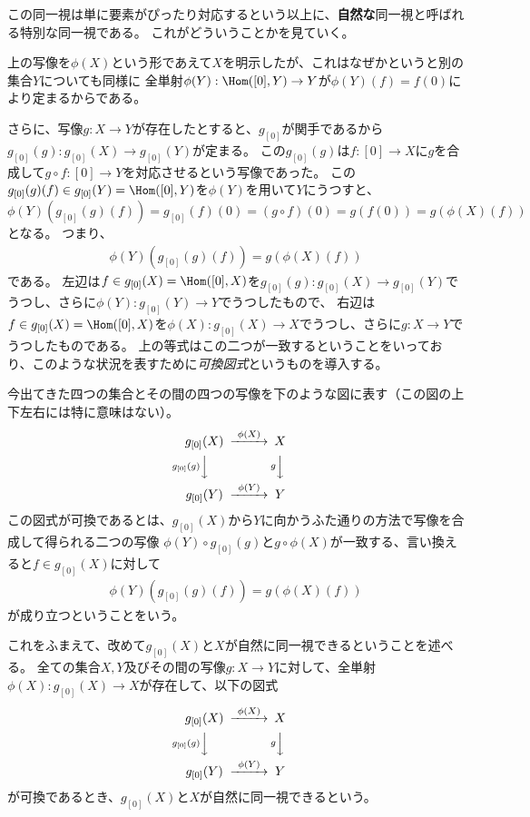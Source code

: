 \documentclass{jsarticle}
\begin{document}
この同一視は単に要素がぴったり対応するという以上に、\textbf{自然な}同一視と呼ばれる特別な同一視である。
これがどういうことかを見ていく。

上の写像を$\phi(X)$という形であえて$X$を明示したが、これはなぜかというと別の集合$Y$についても同様に
全単射$\phi(Y):\Hom([0],Y) \to Y$が$\phi(Y)(f)=f(0)$により定まるからである。

さらに、写像$g:X \to Y$が存在したとすると、$g_{[0]}$が関手であるから$g_{[0]}(g):g_{[0]}(X) \to g_{[0]}(Y)$が定まる。
この$g_{[0]}(g)$は$f:[0] \to X$に$g$を合成して$g\circ f:[0] \to Y$を対応させるという写像であった。
この$g_{[0]}(g)(f)\in g_{[0]}(Y)=\Hom([0],Y)$を$\phi(Y)$を用いて$Y$にうつすと、$\phi(Y)(g_{[0]}(g)(f))=g_{[0]}(f)(0)=(g\circ f)(0)=g(f(0))=g(\phi(X)(f))$となる。
つまり、
\begin{align*}
\phi(Y)(g_{[0]}(g)(f))=g(\phi(X)(f))
\end{align*}
である。
左辺は$f\in g_{[0]}(X)=\Hom([0],X)$を$g_{[0]}(g):g_{[0]}(X) \to g_{[0]}(Y)$でうつし、さらに$\phi(Y):g_{[0]}(Y) \to Y$でうつしたもので、
右辺は$f\in g_{[0]}(X)=\Hom([0],X)$を$\phi(X):g_{[0]}(X) \to X$でうつし、さらに$g:X \to Y$でうつしたものである。
上の等式はこの二つが一致するということをいっており、このような状況を表すために\emph{可換図式}というものを導入する。

今出てきた四つの集合とその間の四つの写像を下のような図に表す（この図の上下左右には特に意味はない）。
\[
\begin{CD}
g_{[0]}(X)@>\phi(X)>>X\\
@Vg_{[0]}(g)VV@VgVV\\
g_{[0]}(Y)@>\phi(Y)>>Y
\end{CD}
\]
この図式が可換であるとは、$g_{[0]}(X)$から$Y$に向かうふた通りの方法で写像を合成して得られる二つの写像
$\phi(Y)\circ g_{[0]}(g)$と$g\circ \phi(X)$が一致する、言い換えると$f\in g_{[0]}(X)$に対して
\begin{align*}
\phi(Y)(g_{[0]}(g)(f))=g(\phi(X)(f))
\end{align*}
が成り立つということをいう。

これをふまえて、改めて$g_{[0]}(X)$と$X$が自然に同一視できるということを述べる。
全ての集合$X, Y$及びその間の写像$g:X \to Y$に対して、全単射$\phi(X):g_{[0]}(X) \to X$が存在して、以下の図式
\[
\begin{CD}
g_{[0]}(X)@>\phi(X)>>X\\
@Vg_{[0]}(g)VV@VgVV\\
g_{[0]}(Y)@>\phi(Y)>>Y
\end{CD}
\]
が可換であるとき、$g_{[0]}(X)$と$X$が自然に同一視できるという。
\end{document}
